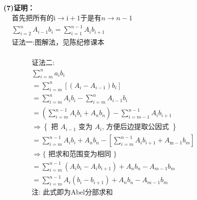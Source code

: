 \documentclass[fontset=windows]{article}
\begin{document}
    \clearpage
    \newpage
    \noindent\textbf{(7)证明：}\\
    \noindent
    $
    \begin{aligned}
        & \mbox{首先把所有的}\mathrm{i}\rightarrow \mathrm{i}+1 \nonumber\mbox{于是有}n\to n-1\\
        & \sum_{i=2}^{n} A_{i-1} b_{i}=\sum_{i=1}^{n-1} A_{i} b_{i+1}\nonumber\\ 
        & \mbox{证法一:图解法，见陈纪修课本}\nonumber\\
    \end{aligned}
    $

    \begin{figure}[!htb]
    \begin{minipage}[t]{0.5\linewidth}
    \vspace{0pt}
    $    
    \begin{aligned}
        &\mbox{证法二:}\nonumber\\
        &\sum_{i=m}^{n} a_{i} b_{i} \nonumber\\
        &=\sum_{i=m}^{n}\left[\left(A_{i}-A_{i-1}\right) b_{i}\right] \nonumber\\
        &=\sum_{i=m}^{n} A_{i} b_{i}-\sum_{i=m}^{n} A_{i-1} b_{i} \nonumber\\
        &=\left(\sum_{i=m}^{n-1} A_{i} b_{i}+A_{n} b_{n}\right)-\sum_{i=m-1}^{n-1} A_{i} b_{i+1}\nonumber\\
        &\Longrightarrow\left\{\text { 把 } A_{i-1} \text { 变为 } A_{i} \text {, 方便后边提取公因式 }\right\} \nonumber\\
        &=\sum_{i=m}^{n-1} A_{i} b_{i}+A_{n} b_{n}-\left[\sum_{i=m}^{n-1} A_{i} b_{i+1}+A_{\mathrm{m}-1} b_{m}\right] \nonumber\\
        & \Longrightarrow\{\text { 把求和范围变为相同 }\} \nonumber\\
        & =\sum_{i=m}^{n-1}\left(A_{i} b_{i}-A_{i} b_{i+1}\right)+A_{n} b_{n}-A_{m-1} b_{m} \nonumber\\
        & =\sum_{i=m}^{n-1} A_{i}\left(b_{i}-b_{i+1}\right)+A_{n} b_{n}-A_{m-1} b_{m}\nonumber\\
        &\mbox{注: 此式即为Abel分部求和}\nonumber
    \end{aligned}
    $
    \end{minipage}
    \vline
    \begin{minipage}[t]{0.5\linewidth}
    \vspace{0pt} %
    \begin{align} 

\end{align}
\end{minipage}
\end{figure}
\end{document}
